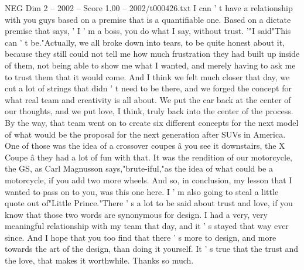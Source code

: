 \begin{textsample}{NEG Dim 2 – 2002 – Score 1.00 – 2002/t000426.txt}
I can ' t have a relationship with you guys based on a premise that is a quantifiable one.
Based on a dictate premise that says, ' I ' m a boss, you do what I say, without trust. '"I said"This can ' t be."Actually, we all broke down into tears, to be quite honest about it, because they still could not tell me how much frustration they had built up inside of them, not being able to show me what I wanted, and merely having to ask me to trust them that it would come.
And I think we felt much closer that day, we cut a lot of strings that didn ' t need to be there, and we forged the concept for what real team and creativity is all about.
We put the car back at the center of our thoughts, and we put love, I think, truly back into the center of the process.
By the way, that team went on to create six different concepts for the next model of what would be the proposal for the next generation after SUVs in America.
One of those was the idea of a crossover coupes â you see it downstairs, the X Coupe â they had a lot of fun with that.
It was the rendition of our motorcycle, the GS, as Carl Magnusson says,"brute-iful,"as the idea of what could be a motorcycle, if you add two more wheels.
And so, in conclusion, my lesson that I wanted to pass on to you, was this one here.
I ' m also going to steal a little quote out of"Little Prince."There ' s a lot to be said about trust and love, if you know that those two words are synonymous for design.
I had a very, very meaningful relationship with my team that day, and it ' s stayed that way ever since.
And I hope that you too find that there ' s more to design, and more towards the art of the design, than doing it yourself.
It ' s true that the trust and the love, that makes it worthwhile.
Thanks so much.

\end{textsample}
